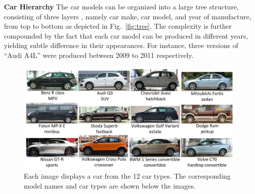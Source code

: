 \documentclass[10pt,twocolumn,letterpaper]{article}
\begin{document}
\textbf{Car Hierarchy}
The car models can be organized into a large tree structure, consisting of three layers , namely car make, car model, and year of manufacture, from top to bottom as depicted in Fig.~\ref{fig:tree}.
%
The complexity is further compounded by the fact that each car model can be produced in different years, yielding subtle difference in their appearances. For instance, three versions of ``Audi A4L'' were produced between 2009 to 2011 respectively.



\begin{figure}[t]\centering
\includegraphics[width=1\linewidth]{type.pdf}
\caption{Each image displays a car from the 12 car types. The corresponding model names and car types are shown below the images.}
\label{fig:type}
\vspace{-4pt}
\end{figure}
\end{document}
